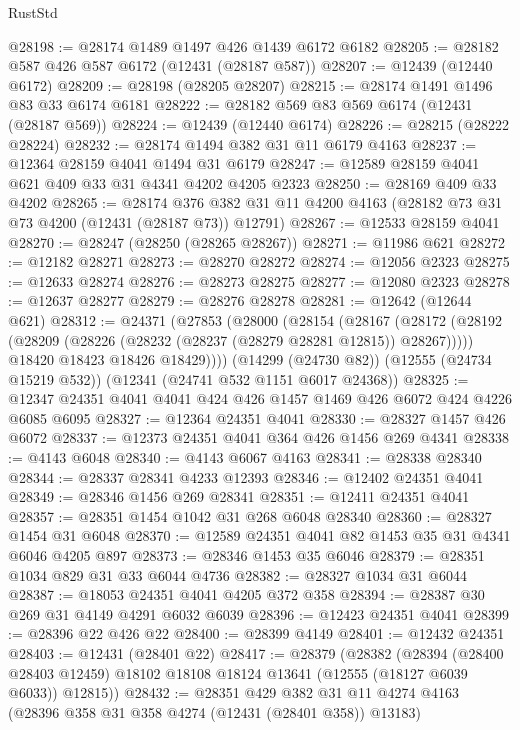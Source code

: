 \begin{lexlean}{RustStd}
\begin{coremodule}
@28198 := @28174 @1489 @1497 @426 @1439 @6172 @6182
@28205 := @28182 @587 @426 @587 @6172 (@12431 (@28187 @587))
@28207 := @12439 (@12440 @6172)
@28209 := @28198 (@28205 @28207)
@28215 := @28174 @1491 @1496 @83 @33 @6174 @6181
@28222 := @28182 @569 @83 @569 @6174 (@12431 (@28187 @569))
@28224 := @12439 (@12440 @6174)
@28226 := @28215 (@28222 @28224)
@28232 := @28174 @1494 @382 @31 @11 @6179 @4163
@28237 := @12364 @28159 @4041 @1494 @31 @6179
@28247 := @12589 @28159 @4041 @621 @409 @33 @31 @4341 @4202 @4205 @2323
@28250 := @28169 @409 @33 @4202
@28265 := @28174
    @376
    @382
    @31
    @11
    @4200
    @4163
    (@28182 @73 @31 @73 @4200 (@12431 (@28187 @73)) @12791)
@28267 := @12533 @28159 @4041
@28270 := @28247 (@28250 (@28265 @28267))
@28271 := @11986 @621
@28272 := @12182 @28271
@28273 := @28270 @28272
@28274 := @12056 @2323
@28275 := @12633 @28274
@28276 := @28273 @28275
@28277 := @12080 @2323
@28278 := @12637 @28277
@28279 := @28276 @28278
@28281 := @12642 (@12644 @621)
@28312 := @24371
    (@27853
      (@28000
        (@28154
          (@28167
            (@28172 (@28192 (@28209 (@28226 (@28232 (@28237 (@28279 @28281 @12815)) @28267)))))
            @18420
            @18423
            @18426
            @18429))))
    (@14299 (@24730 @82))
    (@12555 (@24734 @15219 @532))
    (@12341 (@24741 @532 @1151 @6017 @24368))
@28325 := @12347 @24351 @4041 @4041 @424 @426 @1457 @1469 @426 @6072 @424 @4226 @6085 @6095
@28327 := @12364 @24351 @4041
@28330 := @28327 @1457 @426 @6072
@28337 := @12373 @24351 @4041 @364 @426 @1456 @269 @4341
@28338 := @4143 @6048
@28340 := @4143 @6067 @4163
@28341 := @28338 @28340
@28344 := @28337 @28341 @4233 @12393
@28346 := @12402 @24351 @4041
@28349 := @28346 @1456 @269 @28341
@28351 := @12411 @24351 @4041
@28357 := @28351 @1454 @1042 @31 @268 @6048 @28340
@28360 := @28327 @1454 @31 @6048
@28370 := @12589 @24351 @4041 @82 @1453 @35 @31 @4341 @6046 @4205 @897
@28373 := @28346 @1453 @35 @6046
@28379 := @28351 @1034 @829 @31 @33 @6044 @4736
@28382 := @28327 @1034 @31 @6044
@28387 := @18053 @24351 @4041 @4205 @372 @358
@28394 := @28387 @30 @269 @31 @4149 @4291 @6032 @6039
@28396 := @12423 @24351 @4041
@28399 := @28396 @22 @426 @22
@28400 := @28399 @4149
@28401 := @12432 @24351
@28403 := @12431 (@28401 @22)
@28417 := @28379
    (@28382
      (@28394
        (@28400 @28403 @12459)
        @18102
        @18108
        @18124
        @13641
        (@12555 (@18127 @6039 @6033))
        @12815))
@28432 := @28351
    @429
    @382
    @31
    @11
    @4274
    @4163
    (@28396 @358 @31 @358 @4274 (@12431 (@28401 @358)) @13183)

\end{coremodule}
\end{lexlean}
